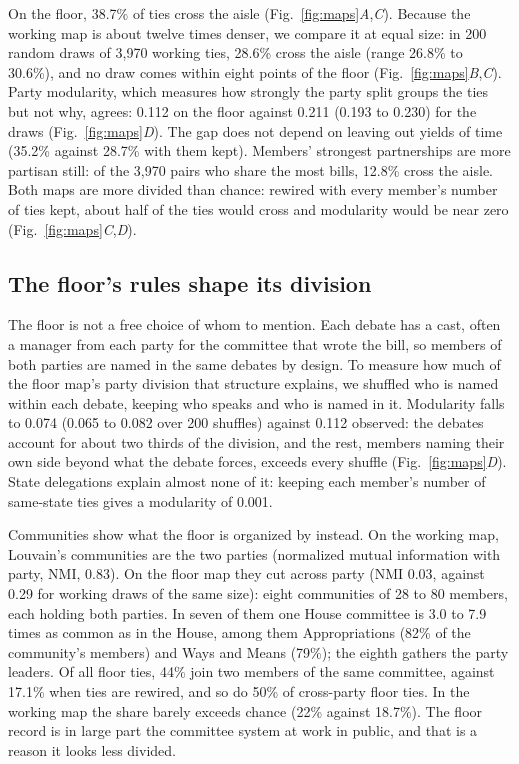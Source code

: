 \documentclass[9pt,twocolumn,twoside]{pnas-new}
\begin{document}
On the floor, 38.7\% of ties cross the aisle (Fig.~\ref{fig:maps}\emph{A},\emph{C}). Because the working map is about
twelve times denser, we compare it at equal size: in 200 random draws of 3,970 working ties, 28.6\% cross the aisle
(range 26.8\% to 30.6\%), and no draw comes within eight points of the floor (Fig.~\ref{fig:maps}\emph{B},\emph{C}).
Party modularity, which measures how strongly the party split groups the ties but not why, agrees: 0.112 on the
floor against 0.211 (0.193 to 0.230) for the draws (Fig.~\ref{fig:maps}\emph{D}). The gap does not depend on
leaving out yields of time (35.2\% against 28.7\% with them kept). Members' strongest partnerships are more partisan
still: of the 3,970 pairs who share the most bills, 12.8\% cross the aisle. Both maps are more divided than chance:
rewired with every member's number of ties kept, about half of the ties would cross and modularity would be near
zero (Fig.~\ref{fig:maps}\emph{C},\emph{D}).


\subsection*{The floor's rules shape its division}
The floor is not a free choice of whom to mention. Each debate has a cast, often a manager from each party for the
committee that wrote the bill, so members of both parties are named in the same debates by design. To measure how
much of the floor map's party division that structure explains, we shuffled who is named within each debate,
keeping who speaks and who is named in it. Modularity falls to 0.074 (0.065 to 0.082 over 200 shuffles) against
0.112 observed: the debates account for about two thirds of the division, and the rest, members naming their own
side beyond what the debate forces, exceeds every shuffle (Fig.~\ref{fig:maps}\emph{D}). State delegations
explain almost none of it: keeping each member's number of same-state ties gives a modularity of 0.001.

Communities show what the floor is organized by instead. On the working map, Louvain's communities are the two
parties (normalized mutual information with party, NMI, 0.83). On the floor map they cut across party (NMI 0.03,
against 0.29 for working draws of the same size): eight communities of 28 to 80 members, each holding both
parties. In seven of them one House committee is 3.0 to 7.9 times as common as in the House, among them
Appropriations (82\% of the community's members) and Ways and Means (79\%); the eighth gathers the party leaders.
Of all floor ties, 44\% join two members of the same committee, against 17.1\% when ties are rewired, and so do
50\% of cross-party floor ties. In the working map the share barely exceeds chance (22\% against 18.7\%). The floor
record is in large part the committee system at work in public, and that is a reason it looks less divided.
\end{document}
